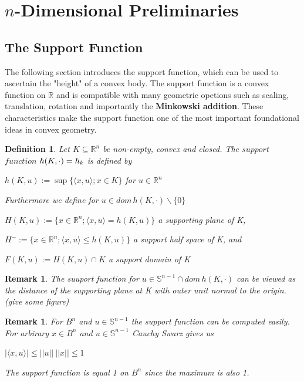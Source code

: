 \documentclass[a4paper]{book}
\newtheorem{remark}[theorem]{Remark}%
\newtheorem{definition}[theorem]{Definition}%
\numberwithin{theorem}{section}%
\begin{document}
\section{$n$-Dimensional Preliminaries}

\subsection{The Support Function}
The following section introduces the support function, which can be used to ascertain the "height" of a convex body. The support function is a convex function on $\mathbb{R}$ and is compatible with many geometric opetions such as scaling, translation, rotation and importantly the \textbf{Minkowski addition}. These characteristics make the support function one of the most important foundational ideas in convex geometry.

\begin{definition}
    Let $K\subseteq\mathbb{R}^n$ be non-empty, convex and closed. The $support$ $function$ $h(K,\cdot\space)=h_k$ is defined by
    \begin{center}
        $h(K,u):=\sup\{\langle x,u\rangle;x\in K\}$ for $u\in\mathbb{R}^n$
    \end{center}
    Furthermore we define for $u\in dom\,h(K,\cdot)\backslash\{0\}$
    \begin{center}
        $H(K,u):=\{x\in\mathbb{R}^n;\langle x,u\rangle=h(K,u)\}$ a supporting plane of K,
        
        $H^{-}:=\{x\in\mathbb{R}^n;\langle x,u\rangle\leq h(K,u)\}$ a support half space of K, and 
        
        $F(K,u):=H(K,u)\cap K$ a support domain of K
    \end{center}
\end{definition}

\begin{remark}
    The suuport function for $u\in\mathbb{S}^{n-1}\cap dom\,h(K,\cdot)$ can be viewed as the distance of the supporting plane at K with outer unit normal to the origin.(give some figure)
\end{remark}

\begin{remark}
    For $B^{n}$ and $u\in\mathbb{S}^{n-1}$ the support function can be computed easily. For arbirary $x\in B^{n}$ and $u\in\mathbb{S}^{n-1}$ Cauchy Swarz gives us
    \begin{center}
        $|\langle x,u\rangle|\leq||u||\:||x||\leq1$
    \end{center}
    The support function is equal 1 on $B^{n}$ since the maximum is also 1.
\end{remark}
\end{document}
